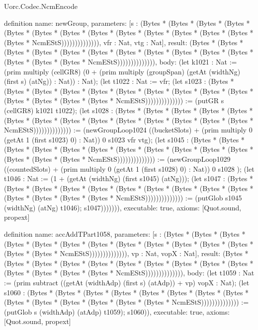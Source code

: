 \begin{lexlean}{Uorc.Codec.NcmEncode}
\begin{semanticmodule}
definition{
  name: newGroup,
  parameters: [s : (Bytes * (Bytes * (Bytes * (Bytes * (Bytes * (Bytes * (Bytes * (Bytes * (Bytes * (Bytes * (Bytes * (Bytes * (Bytes * (Bytes * NcmEStS)))))))))))))), vfr : Nat, vtg : Nat],
  result: (Bytes * (Bytes * (Bytes * (Bytes * (Bytes * (Bytes * (Bytes * (Bytes * (Bytes * (Bytes * (Bytes * (Bytes * (Bytes * (Bytes * NcmEStS)))))))))))))),
  body: (let k1021 : Nat := (prim multiply (cellGR8) (0 + (prim multiply (groupSpan) (getAt (widthNg) (first s) (atNg)) : Nat)) : Nat); (let t1022 : Nat := vfr; (let s1023 : (Bytes * (Bytes * (Bytes * (Bytes * (Bytes * (Bytes * (Bytes * (Bytes * (Bytes * (Bytes * (Bytes * (Bytes * (Bytes * (Bytes * NcmEStS)))))))))))))) := (putGR s (cellGR8) k1021 t1022); (let s1028 : (Bytes * (Bytes * (Bytes * (Bytes * (Bytes * (Bytes * (Bytes * (Bytes * (Bytes * (Bytes * (Bytes * (Bytes * (Bytes * (Bytes * NcmEStS)))))))))))))) := (newGroupLoop1024 ((bucketSlots) + (prim multiply 0 (getAt 1 (first s1023) 0) : Nat)) 0 s1023 vfr vtg); (let s1045 : (Bytes * (Bytes * (Bytes * (Bytes * (Bytes * (Bytes * (Bytes * (Bytes * (Bytes * (Bytes * (Bytes * (Bytes * (Bytes * (Bytes * NcmEStS)))))))))))))) := (newGroupLoop1029 ((countedSlots) + (prim multiply 0 (getAt 1 (first s1028) 0) : Nat)) 0 s1028 ); (let t1046 : Nat := (1 + (getAt (widthNg) (first s1045) (atNg))); (let s1047 : (Bytes * (Bytes * (Bytes * (Bytes * (Bytes * (Bytes * (Bytes * (Bytes * (Bytes * (Bytes * (Bytes * (Bytes * (Bytes * (Bytes * NcmEStS)))))))))))))) := (putGlob s1045 (widthNg) (atNg) t1046); s1047))))))),
  executable: true,
  axioms: [Quot.sound, propext]
}

definition{
  name: accAddTPart1058,
  parameters: [s : (Bytes * (Bytes * (Bytes * (Bytes * (Bytes * (Bytes * (Bytes * (Bytes * (Bytes * (Bytes * (Bytes * (Bytes * (Bytes * (Bytes * NcmEStS)))))))))))))), vp : Nat, vopX : Nat],
  result: (Bytes * (Bytes * (Bytes * (Bytes * (Bytes * (Bytes * (Bytes * (Bytes * (Bytes * (Bytes * (Bytes * (Bytes * (Bytes * (Bytes * NcmEStS)))))))))))))),
  body: (let t1059 : Nat := (prim subtract ((getAt (widthAdp) (first s) (atAdp)) + vp) vopX : Nat); (let s1060 : (Bytes * (Bytes * (Bytes * (Bytes * (Bytes * (Bytes * (Bytes * (Bytes * (Bytes * (Bytes * (Bytes * (Bytes * (Bytes * (Bytes * NcmEStS)))))))))))))) := (putGlob s (widthAdp) (atAdp) t1059); s1060)),
  executable: true,
  axioms: [Quot.sound, propext]
}


\end{semanticmodule}
\end{lexlean}
